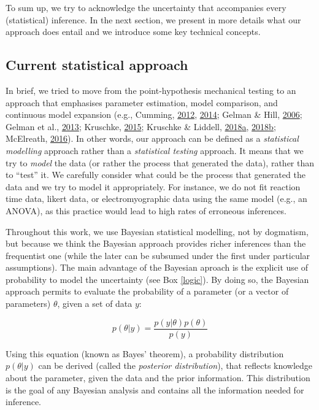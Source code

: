 \documentclass[a4paper,12pt,twoside,openright,oldfontcommands]{memoir}
\begin{document}
To sum up, we try to acknowledge the uncertainty that accompanies every
(statistical) inference. In the next section, we present in more details
what our approach does entail and we introduce some key technical
concepts.

\subsection{Current statistical
approach}\label{current-statistical-approach}

In brief, we tried to move from the point-hypothesis mechanical testing
to an approach that emphasises parameter estimation, model comparison,
and continuous model expansion (e.g., Cumming,
\protect\hyperlink{ref-Cumming2012}{2012},
\protect\hyperlink{ref-cumming_new_2014}{2014}; Gelman \& Hill,
\protect\hyperlink{ref-gelman_data_2006}{2006}; Gelman et al.,
\protect\hyperlink{ref-gelman_bayesian_2013}{2013}; Kruschke,
\protect\hyperlink{ref-kruschke_doing_2015}{2015}; Kruschke \& Liddell,
\protect\hyperlink{ref-kruschke_bayesian_2018}{2018}\protect\hyperlink{ref-kruschke_bayesian_2018}{a},
\protect\hyperlink{ref-kruschke_bayesian_2018-1}{2018}\protect\hyperlink{ref-kruschke_bayesian_2018-1}{b};
McElreath, \protect\hyperlink{ref-R-rethinking}{2016}). In other words,
our approach can be defined as a \emph{statistical modelling} approach
rather than a \emph{statistical testing} approach. It means that we try
to \emph{model} the data (or rather the process that generated the
data), rather than to ``test'' it. We carefully consider what could be
the process that generated the data and we try to model it
appropriately. For instance, we do not fit reaction time data, likert
data, or electromyographic data using the same model (e.g., an ANOVA),
as this practice would lead to high rates of erroneous inferences.

Throughout this work, we use Bayesian statistical modelling, not by
dogmatism, but because we think the Bayesian approach provides richer
inferences than the frequentist one (while the later can be subsumed
under the first under particular assumptions). The main advantage of the
Bayesian aproach is the explicit use of probability to model the
uncertainty (see Box \ref{logic}). By doing so, the Bayesian approach
permits to evaluate the probability of a parameter (or a vector of
parameters) \(\theta\), given a set of data \(y\):

\[p(\theta|y) = \frac{p(y|\theta)p(\theta)}{p(y)}\]

Using this equation (known as Bayes' theorem), a probability
distribution \(p(\theta|y)\) can be derived (called the \emph{posterior
distribution}), that reflects knowledge about the parameter, given the
data and the prior information. This distribution is the goal of any
Bayesian analysis and contains all the information needed for inference.
\end{document}

